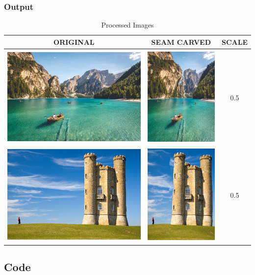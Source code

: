 \subsubsection{Output}


\begin{table}[!ht]
	\begin{center}
		\begin{tabular}{ | c | c | c | }
			\hline
			ORIGINAL & SEAM CARVED & SCALE \\ \hline
			\includegraphics[height=50mm]{question_5/Image-1.eps} & 
			\includegraphics[height=50mm]{question_5/Image-1_scaled_column_by_0.5.eps} & 
				0.5 \\ \hline
			\includegraphics[height=50mm]{question_5/Image-2.eps} & 
			\includegraphics[height=50mm]{question_5/Image-2_scaled_column_by_0.5.eps} & 
				0.5 \\ \hline
		\end{tabular}
	\end{center}
\caption{Processed Images}
\end{table}

\clearpage
\subsection{Code}


